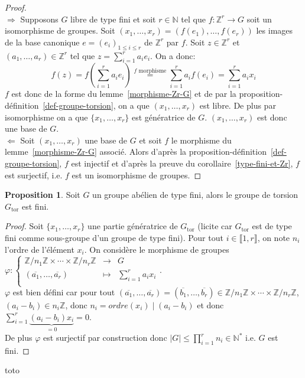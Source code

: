 \documentclass{article}
\newcommand{\Z}{\mathbb{Z}}
\newcommand{\N}{\mathbb{N}}
\newcommand{\Gt}{G_{\mathrm{tor}}}
\newcommand{\dis}{\displaystyle}
\newcommand{\nt}[1]{\llbracket  #1 \rrbracket }
\theoremstyle{definition}
\newtheorem{prop}[defi]{Proposition}
\theoremstyle{remark}
\newcommand{\app}[5]{#1:\left\{\begin{array}{rcl}
#2 & \longrightarrow & #3 \\
#4 & \longmapsto & #5  \\
\end{array}\right.
}
\begin{document}
\begin{proof}\hspace{.1em}\\
\underline{$\Rightarrow$} Supposons $G$ libre de type fini et soit $r\in\N$ tel que $f:\Z^r\to G$ soit un isomorphisme de groupes. Soit $(x_1, \ldots ,x_r)=(f(e_1),\ldots, f(e_r))$ les images de la base canonique $e=(e_i)_{1\leqslant i\leqslant r}$ de $\Z^r$ par $f$. Soit $z\in\Z^r$ et $(a_1,\ldots,a_r)\in\Z^r$ tel que $z=\dis\sum_{i=1}^r a_ie_i$. On a donc:
$$f(z)=f(\dis\sum_{i=1}^r a_i e_i)\stackrel{\textrm{$f$ morphisme}}{=}\dis\sum_{i=  1}^r a_if(e_i)=\dis\sum_{i=  1}^r a_ix_i$$
$f$ est donc de la forme du lemme~\ref{morphisme-Zr-G} et de par la proposition-d\'efinition~\ref{def-groupe-torsion}, on a que $(x_1, \ldots ,x_r)$ est libre. De plus par isomorphisme on a que $\{x_1, \ldots ,x_r\}$ est génératrice de $G$. $(x_1, \ldots ,x_r)$ est donc une base de $G$.\\
\underline{$\Leftarrow$} Soit $(x_1, \ldots ,x_r)$ une base de $G$ et soit $f$ le morphisme du lemme~\ref{morphisme-Zr-G} associ\'e. Alors d'apr\`es la proposition-d\'efinition~\ref{def-groupe-torsion}, $f$ est injectif et d'apr\`es la preuve du corollaire~\ref{type-fini-et-Zr}, $f$ est surjectif, i.e. $f$ est un isomorphisme de groupes.
\end{proof}

\begin{prop}
Soit $G$ un groupe abélien de type fini, alors le groupe de torsion $\Gt$ est fini.
\end{prop}

\begin{proof}
Soit $\{x_1, \ldots ,x_r\}$ une partie génératrice de $\Gt$ (licite car $\Gt$ est de type fini comme sous-groupe d'un groupe de type fini). Pour tout $i \in \nt{1,r}$, on note $n_i$ l'ordre de l'élément $x_i$. On considère le morphisme de groupes $\app{\varphi}{\Z/n_1\Z \times \cdots \times \Z/n_r\Z}{G}{(\overline{a_1}, \ldots, \overline{a_r})}{\dis \sum_{i=1}^r a_ix_i}$.\\
$\varphi$ est bien défini car pour tout $(\overline{a_1}, \ldots, \overline{a_r})=(\overline{b_1}, \ldots, \overline{b_r}) \in \Z/n_1\Z \times \cdots \times \Z/n_r\Z$, $(a_i-b_i)\in n_i\Z$, donc $n_i=ordre(x_i)\mid (a_i-b_i)$ et donc $\dis \sum_{i=1}^r \underbrace{(a_i-b_i)x_i}_{=0}=0$.\\
De plus $\varphi$ est surjectif par construction  donc $\vert G \vert \leqslant \dis \prod_{i=1}^r n_i \in \N^*$ i.e. $G$ est fini.
\end{proof}

toto
\end{document}
